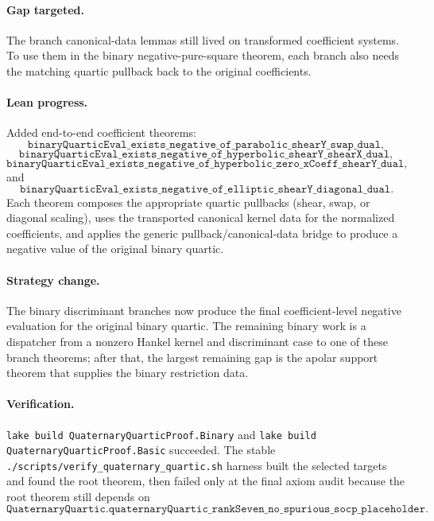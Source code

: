 \documentclass[11pt]{article}
\begin{document}
\paragraph{Gap targeted.}
The branch canonical-data lemmas still lived on transformed coefficient
systems.  To use them in the binary negative-pure-square theorem, each branch
also needs the matching quartic pullback back to the original coefficients.

\paragraph{Lean progress.}
Added end-to-end coefficient theorems:
\[
\texttt{binaryQuarticEval\_exists\_negative\_of\_parabolic\_shearY\_swap\_dual},
\]
\[
\texttt{binaryQuarticEval\_exists\_negative\_of\_hyperbolic\_shearY\_shearX\_dual},
\]
\[
\texttt{binaryQuarticEval\_exists\_negative\_of\_hyperbolic\_zero\_xCoeff\_shearY\_dual},
\]
and
\[
\texttt{binaryQuarticEval\_exists\_negative\_of\_elliptic\_shearY\_diagonal\_dual}.
\]
Each theorem composes the appropriate quartic pullbacks (shear, swap, or
diagonal scaling), uses the transported canonical kernel data for the
normalized coefficients, and applies the generic pullback/canonical-data bridge
to produce a negative value of the original binary quartic.

\paragraph{Strategy change.}
The binary discriminant branches now produce the final coefficient-level
negative evaluation for the original binary quartic.  The remaining binary
work is a dispatcher from a nonzero Hankel kernel and discriminant case to one
of these branch theorems; after that, the largest remaining gap is the apolar
support theorem that supplies the binary restriction data.

\paragraph{Verification.}
\texttt{lake build QuaternaryQuarticProof.Binary} and
\texttt{lake build QuaternaryQuarticProof.Basic} succeeded.  The stable
\texttt{./scripts/verify\_quaternary\_quartic.sh} harness built the selected
targets and found the root theorem, then failed only at the final axiom audit
because the root theorem still depends on
\[
\texttt{QuaternaryQuartic.quaternaryQuartic\_rankSeven\_no\_spurious\_socp\_placeholder}.
\]
\end{document}

